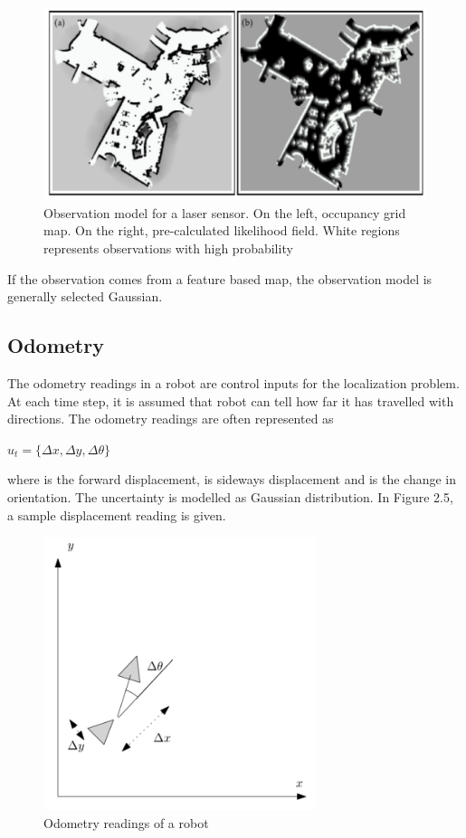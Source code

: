\begin{figure}[!htbp]
\centering
\includegraphics[width=\textwidth]{thesisChapters/images/figure24.png}
\caption{Observation model for a laser sensor. On the left, occupancy grid map. On the right, pre-calculated likelihood field. White regions represents observations with high probability \cite{thrun2005}}
\end{figure}

If the observation comes from a feature based map, the observation model is generally selected Gaussian.

\subsection{Odometry}
The odometry readings in a robot are control inputs for the localization problem. At each time step, it is assumed that robot can tell how far it has travelled with directions. The odometry readings are often represented as

$u_{t} = \{ \Delta x, \Delta y, \Delta \theta \}$

where  is the forward displacement,  is sideways displacement and \text{$\Delta \theta$} is the change in orientation. The uncertainty is modelled as Gaussian distribution. In Figure 2.5, a sample displacement reading is given.

\begin{figure}[!htbp]
\centering
\includegraphics[width=8cm,height=8cm,angle=0]{thesisChapters/images/figure25.png}
\caption{Odometry readings of a robot}
\end{figure}

